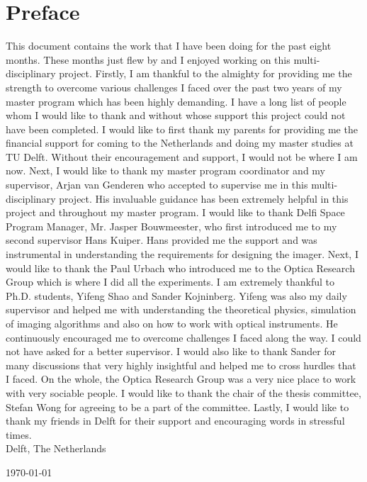 \chapter*{Preface}
This document contains the work that I have been doing for the past eight months. These months just flew by and I enjoyed working on this multi-disciplinary project. Firstly, I am thankful to the almighty for providing me the strength to overcome various challenges I faced over the past two years of my master program which has been highly demanding. I have a long list of people whom I would like to thank and without whose support this project could not have been completed.
I would like to first thank my parents for providing me the financial support for coming to the Netherlands and doing my master studies at TU Delft. Without their encouragement and support, I would not be where I am now. Next, I would like to thank my master program coordinator and my supervisor, Arjan van Genderen who accepted to supervise me in this multi-disciplinary project. His invaluable guidance has been extremely helpful in this project and throughout my master program. 
I would like to thank Delfi Space Program Manager, Mr. Jasper Bouwmeester, who first introduced me to my second supervisor Hans Kuiper. Hans provided me the support and was instrumental in understanding the requirements for designing the imager. Next, I would like to thank the Paul Urbach who introduced me to the Optica Research Group which is where I did all the experiments. I am extremely thankful to Ph.D. students, Yifeng Shao and Sander Kojninberg. Yifeng was also my daily supervisor and helped me with understanding the theoretical physics, simulation of imaging algorithms and also on how to work with optical instruments. He continuously encouraged me to overcome challenges I faced along the way. I could not have asked for a better supervisor. I would also like to thank Sander for many discussions that very highly insightful and helped me to cross hurdles that I faced. On the whole, the Optica Research Group was a very nice place to work with very sociable people. I would like to thank the chair of the thesis committee, Stefan Wong for agreeing to be a part of the committee. Lastly, I would like to thank my friends in Delft for their support and encouraging words in stressful times. \\


\noindent
Delft, The Netherlands

\noindent
\today
